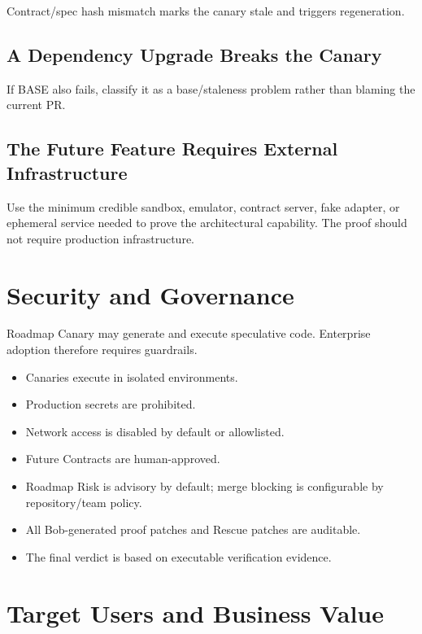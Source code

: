 \documentclass[12pt]{article}
\begin{document}
Contract/spec hash mismatch marks the canary stale and triggers regeneration.

\subsection{A Dependency Upgrade Breaks the Canary}

If BASE also fails, classify it as a base/staleness problem rather than blaming the current PR.

\subsection{The Future Feature Requires External Infrastructure}

Use the minimum credible sandbox, emulator, contract server, fake adapter, or ephemeral service needed to prove the architectural capability. The proof should not require production infrastructure.

\section{Security and Governance}

Roadmap Canary may generate and execute speculative code. Enterprise adoption therefore requires guardrails.

\begin{itemize}
    \item Canaries execute in isolated environments.
    \item Production secrets are prohibited.
    \item Network access is disabled by default or allowlisted.
    \item Future Contracts are human-approved.
    \item Roadmap Risk is advisory by default; merge blocking is configurable by repository/team policy.
    \item All Bob-generated proof patches and Rescue patches are auditable.
    \item The final verdict is based on executable verification evidence.
\end{itemize}

\section{Target Users and Business Value}
\end{document}

